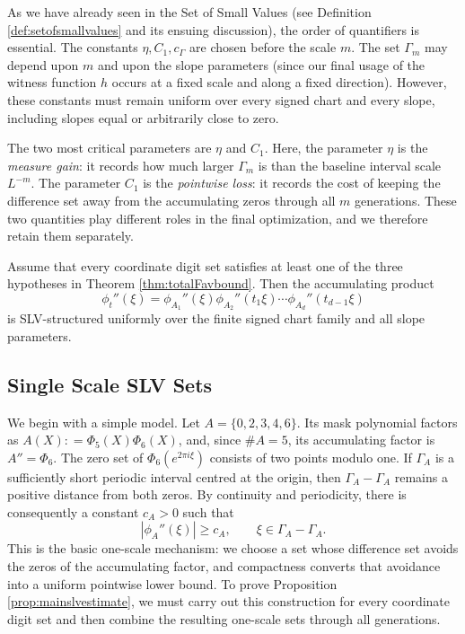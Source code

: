 \documentclass[12pt]{amsart}
\numberwithin{equation}{section}
\begin{document}
As we have already seen in the Set of Small Values (see Definition \ref{def:setofsmallvalues} and its ensuing discussion), the order of quantifiers is essential.  The constants $\eta,C_1,c_\Gamma$ are chosen before the scale $m$.  The set $\Gamma_m$ may depend upon $m$ and upon the slope parameters (since our final usage of the witness function $h$ occurs at a fixed scale and along a fixed direction). However, these constants must remain uniform over every signed chart and every slope, including slopes equal or arbitrarily close to zero.

The two most critical parameters are $\eta$ and $C_1$. Here, the parameter $\eta$ is the \textit{measure gain}: it records how much larger $\Gamma_m$ is than the baseline interval scale $L^{-m}$.  The parameter $C_1$ is the \textit{pointwise loss}: it records the cost of keeping the difference set away from the accumulating zeros through all $m$ generations.  These two quantities play different roles in the final optimization, and we therefore retain them separately.

\begin{proposition}\label{prop:mainslvestimate}
Assume that every coordinate digit set satisfies at least one of the three hypotheses in Theorem \ref{thm:totalFavbound}.  Then the accumulating product
\[
\phi_t''(\xi)=\phi_{A_1}''(\xi)\phi_{A_2}''(t_1\xi)\cdots\phi_{A_d}''(t_{d-1}\xi)
\]
is SLV-structured uniformly over the finite signed chart family and all slope parameters.
\end{proposition}

\subsection{Single Scale SLV Sets}

We begin with a simple model.  Let $A=\{0,2,3,4,6\}$.  Its mask polynomial factors as $A(X) : = \Phi_5(X)\Phi_6(X)$, and, since $\#A=5$, its accumulating factor is $A''=\Phi_6$.  The zero set of $\Phi_6(e^{2\pi i\xi})$ consists of two points modulo one.  If $\Gamma_A$ is a sufficiently short periodic interval centred at the origin, then $\Gamma_A-\Gamma_A$ remains a positive distance from both zeros.  By continuity and periodicity, there is consequently a constant $c_A>0$ such that
\[
 |\phi_A''(\xi)|\geq c_A,
 \qquad \xi\in\Gamma_A-\Gamma_A.
\]
This is the basic one-scale mechanism: we choose a set whose difference set avoids the zeros of the accumulating factor, and compactness converts that avoidance into a uniform pointwise lower bound. To prove Proposition \ref{prop:mainslvestimate}, we must carry out this construction for every coordinate digit set and then combine the resulting one-scale sets through all generations. 
\end{document}
